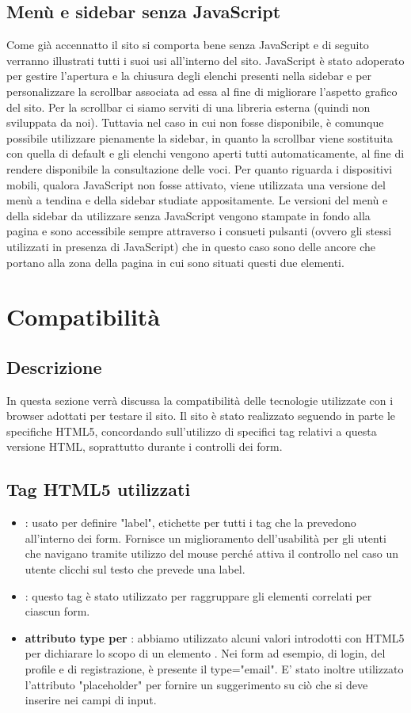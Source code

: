\documentclass[12pt]{article}
\begin{document}
	\subsection{Menù e sidebar senza JavaScript}
		Come già accennatto il sito si comporta bene senza JavaScript e di seguito verranno illustrati tutti i suoi usi all'interno del sito.
		JavaScript è stato adoperato per gestire l'apertura e la chiusura degli elenchi presenti nella sidebar e per  personalizzare la scrollbar associata ad essa al fine di migliorare l'aspetto grafico del sito. Per la scrollbar ci siamo serviti di una libreria esterna (quindi non sviluppata da noi). Tuttavia nel caso in cui non fosse disponibile, è comunque possibile utilizzare pienamente la sidebar, in quanto la scrollbar viene sostituita con quella di default e gli elenchi vengono aperti tutti automaticamente, al fine di rendere disponibile la consultazione delle voci. Per quanto riguarda i dispositivi mobili, qualora JavaScript non fosse attivato, viene utilizzata una versione del menù a tendina e della sidebar studiate appositamente. Le versioni del menù e della sidebar da utilizzare senza JavaScript vengono stampate in fondo alla pagina e sono accessibile sempre attraverso i consueti pulsanti (ovvero gli stessi utilizzati in presenza di JavaScript) che in questo caso sono delle ancore che portano alla zona della pagina in cui sono situati questi due elementi.
	\section{Compatibilità}
	\subsection{Descrizione}
	In questa sezione verrà discussa la compatibilità delle tecnologie utilizzate con i browser adottati per testare il sito. Il sito è stato realizzato seguendo in parte le specifiche HTML5, concordando sull'utilizzo  di specifici tag relativi a questa versione HTML, soprattutto durante i controlli dei form.
	\subsection{Tag HTML5 utilizzati}
	\begin{itemize}
		\item \textbf{}: usato per definire "label", etichette per tutti i tag che la prevedono all'interno dei form. Fornisce un miglioramento dell'usabilità per gli utenti che navigano tramite utilizzo del mouse perché attiva il controllo nel caso un utente clicchi sul testo che prevede una label.
		\item \textbf{}: questo tag è stato utilizzato per raggruppare gli elementi correlati per ciascun form.
		\item \textbf{attributo type per }: abbiamo utilizzato alcuni valori introdotti con HTML5 per dichiarare lo scopo di un elemento . Nei form ad esempio, di login, del profile e di registrazione, è presente il type="email".
		E' stato inoltre utilizzato l'attributo "placeholder" per fornire un suggerimento su ciò che si deve inserire nei campi di input.
	\end{itemize}
\end{document}
